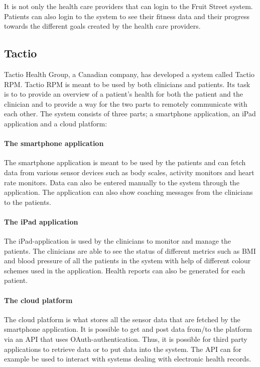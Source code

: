 \documentclass{cslthse-msc}
\begin{document}
It is not only the health care providers that can login to the Fruit Street system. Patients can also login to the system to see their fitness data and their progress towards the different goals created by the health care providers\cite{FruitStreetVideo}.

\subsection{Tactio}
Tactio Health Group, a Canadian company, has developed a system called Tactio RPM. Tactio RPM is meant to be used by both clinicians and patients. Its task is to to provide an overview of a patient's health for both the patient and the clinician and to provide a way for the two parts to remotely communicate with each other. The system consists of three parts; a smartphone application, an iPad application and a cloud platform: 

\paragraph{The smartphone application} The smartphone application is meant to be used by the patients and can fetch data from various sensor devices such as body scales, activity monitors and heart rate monitors. Data can also be entered manually to the system through the application. The application can also show coaching messages from the clinicians to the patients.

\paragraph{The iPad application} The iPad-application is used by the clinicians to monitor and manage the patients. The clinicians are able to see the status of different metrics such as BMI and blood pressure of all the patients in the system with help of different colour schemes used in the application. Health reports can also be generated for each patient. 

\paragraph{The cloud platform} The cloud platform is what stores all the sensor data that are fetched by the smartphone application. It is possible to get and post data from/to the platform via an API that uses OAuth-authentication. Thus, it is possible for third party applications to retrieve data or to put data into the system. The API can for example be used to interact with systems dealing with electronic health records\cite{tactio2014}\cite{TactioWebsite}.
\end{document}
